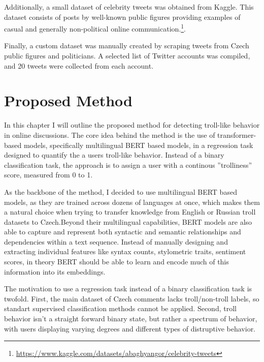 \documentclass[twoside]{ctuthesis}
\theoremstyle{plain}
\theoremstyle{definition}
\theoremstyle{note}
\begin{document}
Additionally, a small dataset of celebrity tweets was obtained from Kaggle. This dataset consists of posts by well-known public figures providing examples of casual and generally non-political online communication.\footnote{\url{https://www.kaggle.com/datasets/abaghyangor/celebrity-tweets}}.\par

Finally, a custom dataset was manually created by scraping tweets from Czech public figures and politicians. A selected list of Twitter accounts was compiled, and 20 tweets were collected from each account. \par

\chapter{Proposed Method}
In this chapter I will outline the proposed method for detecting troll-like behavior in online discussions. The core idea behind the method is the use of transformer-based models, specifically multilingual BERT based models, in a regression task designed to quantify the a users troll-like behavior. Instead of a binary classification task, the approach is to assign a user with a continous ''trolliness'' score, measured from 0 to 1.\par
As the backbone of the method, I decided to use multilingual BERT based models, as they are trained across dozens of languages at once, which makes them a natural choice when trying to transfer knowledge from English or Russian troll datasets to Czech.Beyond their multilingual capabilities, BERT models are also able to capture and represent both syntactic and semantic relationships and dependencies within a text sequence. Instead of manually designing and extracting individual features like syntax counts, stylometric traits, sentiment scores, in theory BERT should be able to learn and encode much of this information into its embeddings.\cite{Rogers2020}\par
The motivation to use a regression task instead of a binary classification task is twofold. First, the main dataset of Czech comments lacks troll/non-troll labels, so standart supervised classification methods cannot be applied. Second, troll behavior isn't a straight forward binary state, but rather a spectrum of behavior, with users displaying varying degrees and different types of distruptive behavior.\par
\end{document}
